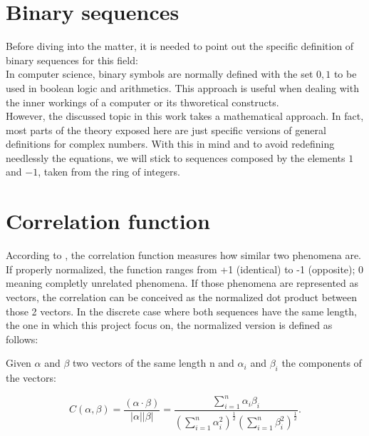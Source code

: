 \section{Binary sequences}

Before diving into the matter, it is needed to point out the specific definition
of binary sequences for this field:\\

In computer science, binary symbols are normally defined with the set ${0, 1}$ to
be used in boolean logic and arithmetics. This approach is useful when dealing
with the inner workings of a computer or its thworetical constructs.\\

However, the discussed topic in this work takes a mathematical approach. In fact,
most parts of the theory exposed here are just specific versions of general
definitions for complex numbers. With this in mind and to avoid redefining
needlessly the equations, we will stick to sequences composed by the elements
$1$ and $-1$, taken from the ring of integers.

\section{Correlation function}

According to \citet{golomb_ref}, the correlation function measures how similar
two phenomena are. If properly normalized, the function ranges from
+1 (identical) to -1 (opposite); 0 meaning completly unrelated phenomena.
If those phenomena are represented as vectors, the correlation can be conceived
as the normalized dot product between those 2 vectors.
In the discrete case where both sequences have the same length, the one in which
this project focus on, the normalized version is defined as follows:

\begin{definition}\label{def:1}

Given $\alpha$ and $\beta$ two vectors of the same length n and $\alpha_{i}$
and $\beta_{i}$ the components of the vectors:

\begin{equation}\label{eq:1}
C(\alpha , \beta)=\frac{(\alpha \cdot  \beta)}{|\alpha||\beta|}=\frac{\sum_{i=1}^{n} \alpha_{i}\beta_{i}}{(\sum_{i=1}^{n} \alpha_{i}^{2})^{\frac{1}{2}}(\sum_{i=1}^{n} \beta_{i}^{2})^\frac{1}{2}}.
\end{equation}
\end{definition}

